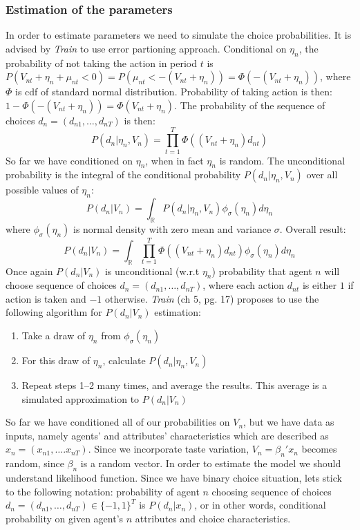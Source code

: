 \documentclass[11pt,a4paper]{article}
\begin{document}
\subsubsection*{Estimation of the parameters}
In order to estimate parameters we need to simulate the choice
probabilities. It is advised by \textit{Train} to use error
partioning approach. Conditional on $ \eta_n $, the probability
of not taking the action in period $ t $ is
$ P(V_{nt} + \eta_n + \mu_{nt} < 0) = P(\mu_{nt} < -(V_{nt} + \eta_n )) =
    \Phi(-(V_{nt} + \eta_n))$, where $ \Phi $ is cdf of standard normal
distribution. Probability of taking action is then:
$1 - \Phi(-(V_{nt} + \eta_n)) = \Phi(V_{nt} + \eta_n)$.
The probability of the sequence of choices $ d_n = (d_{n1}, \dots, d_{nT}) $
is then:
$$
    P(d_n |\eta_n, V_n) = \prod_{t=1}^{T}\Phi((V_{nt} + \eta_n)d_{nt})
$$
So far we have conditioned on $ \eta_n $, when in fact $ \eta_n $
is random. The unconditional probability is the integral of the
conditional probability $ P(d_n |\eta_n, V_n) $ over all possible
values of $ \eta_n $:
$$ P(d_n | V_n) = \int_{\mathbb{R}}  P(d_n |\eta_n, V_n) \phi_\sigma(\eta_n)
    d\eta_n$$
where $ \phi_\sigma (\eta_n) $ is normal density with zero mean and
variance $ \sigma $. Overall result:
$$
    P(d_n| V_n) = \int_{\mathbb{R}}  \prod_{t=1}^{T}\Phi((V_{nt} + \eta_n)
    d_{nt}) \phi_\sigma(\eta_n)d\eta_n
$$
Once again $ P(d_n| V_n) $ is unconditional (w.r.t $\eta_n$) probability that
agent $ n $ will choose sequence of choices $ d_n = (d_{n1}, \dots, d_{nT}) $,
where each action $ d_{nt} $ is either $ 1 $ if action is taken and
$-1$ otherwise. \textit{Train} (ch 5, pg. 17) proposes to use the
following algorithm for $ P(d_n| V_n) $ estimation:
\begin{enumerate}[itemsep=0em]
    \item Take a draw of $\eta_n$ from $\phi_{\sigma}(\eta_n)$
    \item For this draw of $ \eta_n $, calculate $ P(d_n |\eta_n, V_n) $
    \item Repeat steps 1–2 many times, and average the results.
          This average is a simulated approximation to $ P(d_n| V_n) $
\end{enumerate}

So far we have conditioned all of our probabilities on $V_n$, but we have data
as inputs, namely agents' and attributes' characteristics which are described
as $x_{n} = (x_{n1}, \dots. x_{nT})$. Since we incorporate taste variation,
$V_n = \beta_n'x_{n}$ becomes random, since $\beta_n$ is a random vector.
In order to estimate the model we should understand likelihood function. Since
we have binary choice situation, lets stick to the following notation:
probability of agent $n$ choosing
sequence of choices $ d_n = (d_{n1}, \dots, d_{nT}) \in \{-1, 1\}^{T}$ is
$P(d_n |x_n)$, or in other words, conditional probability on given agent's $n$
attributes and choice characteristics.
\end{document}
